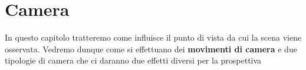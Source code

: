 \chapter{Camera}
In questo capitolo tratteremo come influisce il punto di vista da cui la scena viene osservata. Vedremo dunque come si
effettuano dei \textbf{movimenti di camera} e due tipologie di camera che ci daranno due effetti diversi per la
prospettiva